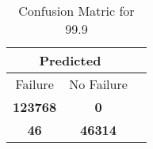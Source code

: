\begin{table}[] 
\caption{Confusion Matric for 99.9} 
\label{Table: Prediction Accuracy-DMD99.9OnlySunEKF-resetReflectionperfectNoFailurePrediction-Reflection} 
\centering 
\begin{tabular} 
 {@{}ccc@{}} 
\toprule 
\multicolumn{2}{c}{\textbf{Predicted}}
 \\ \midrule 
\multicolumn{1}{|c|}{Failure} & 
\multicolumn{1}{c|}{No Failure}
 \\ \midrule 
\multicolumn{1}{|c|}{\color{green}\textbf{123768}} & 
\multicolumn{1}{c|}{\color{red}\textbf{0}}
 \\ \midrule 
\multicolumn{1}{|c|}{\color{red}\textbf{46}} & 
\multicolumn{1}{c|}{\color{green}\textbf{46314}}
 \\ \bottomrule 
\end{tabular} 
\end{table} 
